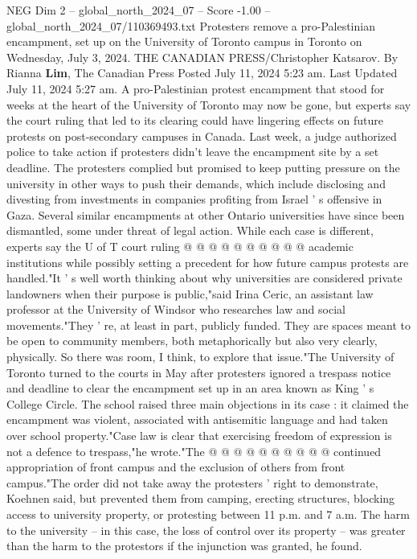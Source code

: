 \begin{textsample}{NEG Dim 2 – global\_north\_2024\_07 – Score -1.00 – global\_north\_2024\_07/110369493.txt}  \label{ex:f2_neg_254}
Protesters remove a pro-Palestinian encampment, set up on the University of Toronto campus in Toronto on Wednesday, July 3, 2024.
THE CANADIAN PRESS/Christopher Katsarov.
By Rianna \textbf{Lim}, The Canadian Press Posted July 11, 2024 5:23 am.
Last Updated July 11, 2024 5:27 am.
A pro-Palestinian protest encampment that stood for weeks at the heart of the University of Toronto may now be gone, but experts say the court ruling that led to its clearing could have lingering effects on future protests on post-secondary campuses in Canada.
Last week, a judge authorized police to take action if protesters didn't leave the encampment site by a set deadline.
The protesters complied but promised to keep putting pressure on the university in other ways to push their demands, which include disclosing and divesting from investments in companies profiting from Israel ' s offensive in Gaza.
Several similar encampments at other Ontario universities have since been dismantled, some under threat of legal action.
While each case is different, experts say the U of T court ruling @ @ @ @ @ @ @ @ @ @ academic institutions while possibly setting a precedent for how future campus protests are handled."It ' s well worth thinking about why universities are considered private landowners when their purpose is public,"said Irina Ceric, an assistant law professor at the University of Windsor who researches law and social movements."They ' re, at least in part, publicly funded.
They are spaces meant to be open to community members, both metaphorically but also very clearly, physically.
So there was room, I think, to explore that issue."The University of Toronto turned to the courts in May after protesters ignored a trespass notice and deadline to clear the encampment set up in an area known as King ' s College Circle.
The school raised three main objections in its case : it claimed the encampment was violent, associated with antisemitic language and had taken over school property."Case law is clear that exercising freedom of expression is not a defence to trespass,"he wrote."The @ @ @ @ @ @ @ @ @ @ continued appropriation of front campus and the exclusion of others from front campus."The order did not take away the protesters ' right to demonstrate, Koehnen said, but prevented them from camping, erecting structures, blocking access to university property, or protesting between 11 p.m. and 7 a.m.
The harm to the university -- in this case, the loss of control over its property -- was greater than the harm to the protestors if the injunction was granted, he found.

\end{textsample}
